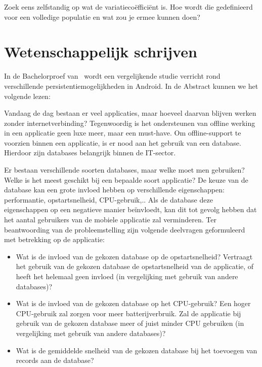 \begin{exercise}
		Zoek eens zelfstandig op wat de variatieco\"effici\"ent is. Hoe
		wordt die gedefinieerd voor een volledige populatie en wat zou
		je ermee kunnen doen?
\end{exercise}

\section{Wetenschappelijk schrijven}
 
 In de Bachelorproef van~\textcite{Akin2016} wordt een vergelijkende studie verricht rond verschillende persistentiemogelijkheden in Android. In de Abstract kunnen we het volgende lezen:
 
 \begin{displayquote}
 	Vandaag de dag bestaan er veel applicaties, maar hoeveel daarvan blijven werken
 	zonder internetverbinding? Tegenwoordig is het ondersteunen van offline werking in
 	een applicatie geen luxe meer, maar een must-have. Om offline-support te voorzien
 	binnen een applicatie, is er nood aan het gebruik van een database. Hierdoor zijn
 	databases belangrijk binnen de IT-sector.
 	
 	Er bestaan verschillende soorten databases, maar welke moet men gebruiken?
 	Welke is het meest geschikt bij een bepaalde soort applicatie? De keuze van de database
 	kan een grote invloed hebben op verschillende eigenschappen: performantie,
 	opstartsnelheid, CPU-gebruik,.. Als de database deze eigenschappen op een negatieve
 	manier beïnvloedt, kan dit tot gevolg hebben dat het aantal gebruikers van de mobiele
 	applicatie zal verminderen. Ter beantwoording van de probleemstelling zijn volgende
 	deelvragen geformuleerd met betrekking op de applicatie:
 	\begin{itemize}
 		\item 	Wat is de invloed van de gekozen database op de opstartsnelheid? Vertraagt het
 		gebruik van de gekozen database de opstartsnelheid van de applicatie, of heeft
 		het helemaal geen invloed (in vergelijking met gebruik van andere databases)?
 		\item Wat is de invloed van de gekozen database op het CPU-gebruik? Een hoger
 		CPU-gebruik zal zorgen voor meer batterijverbruik. Zal de applicatie bij gebruik
 		van de gekozen database meer of juist minder CPU gebruiken (in vergelijking
 		met gebruik van andere databases)?
 		\item  Wat is de gemiddelde snelheid van de gekozen database bij het toevoegen van
 		records aan de database?
 	\end{itemize}
 	

\end{displayquote}
